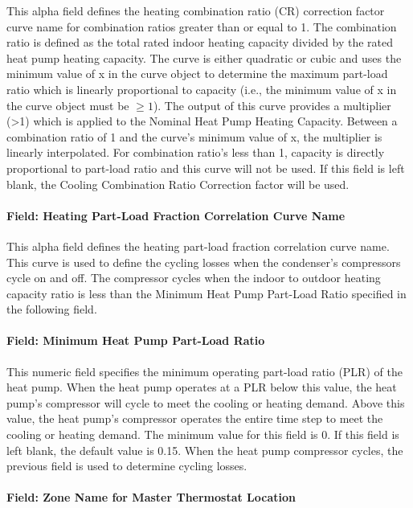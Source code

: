 This alpha field defines the heating combination ratio (CR) correction factor curve name for combination ratios greater than or equal to 1. The combination ratio is defined as the total rated indoor heating capacity divided by the rated heat pump heating capacity. The curve is either quadratic or cubic and uses the minimum value of x in the curve object to determine the maximum part-load ratio which is linearly proportional to capacity (i.e., the minimum value of x in the curve object must be \(\ge 1\)). The output of this curve provides a multiplier (\textgreater{}1) which is applied to the Nominal Heat Pump Heating Capacity. Between a combination ratio of 1 and the curve's minimum value of x, the multiplier is linearly interpolated. For combination ratio's less than 1, capacity is directly proportional to part-load ratio and this curve will not be used. If this field is left blank, the Cooling Combination Ratio Correction factor will be used.

\paragraph{Field: Heating Part-Load Fraction Correlation Curve Name}\label{field-heating-part-load-fraction-correlation-curve-name}

This alpha field defines the heating part-load fraction correlation curve name. This curve is used to define the cycling losses when the condenser's compressors cycle on and off. The compressor cycles when the indoor to outdoor heating capacity ratio is less than the Minimum Heat Pump Part-Load Ratio specified in the following field.

\paragraph{Field: Minimum Heat Pump Part-Load Ratio}\label{field-minimum-heat-pump-part-load-ratio-000}

This numeric field specifies the minimum operating part-load ratio (PLR) of the heat pump. When the heat pump operates at a PLR below this value, the heat pump's compressor will cycle to meet the cooling or heating demand. Above this value, the heat pump's compressor operates the entire time step to meet the cooling or heating demand. The minimum value for this field is 0. If this field is left blank, the default value is 0.15. When the heat pump compressor cycles, the previous field is used to determine cycling losses.

\paragraph{Field: Zone Name for Master Thermostat Location}\label{field-zone-name-for-master-thermostat-location-000}

